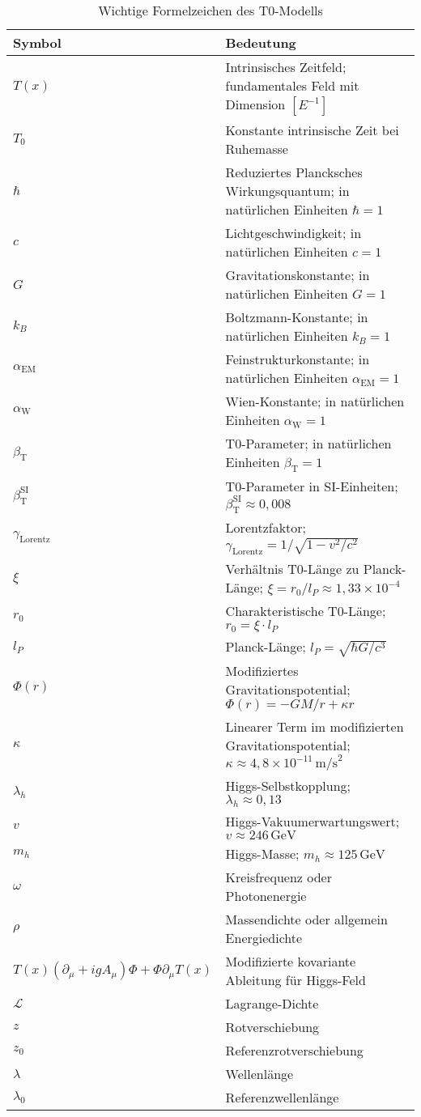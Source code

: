 \documentclass[12pt,a4paper]{article}
\newcommand{\Tfield}{T(x)}
\newcommand{\alphaEM}{\alpha_{\text{EM}}}
\newcommand{\alphaW}{\alpha_{\text{W}}}
\newcommand{\betaT}{\beta_{\text{T}}}
\newcommand{\Tzero}{T_0}
\newcommand{\gammaf}{\gamma_{\text{Lorentz}}}
\newcommand{\DhiggsT}{\Tfield (\partial_\mu + ig A_\mu) \Phi + \Phi \partial_\mu \Tfield}
\begin{document}
	\begin{table}[h]
		\centering
		\begin{tabular}{lp{12cm}}
			\toprule
			\textbf{Symbol} & \textbf{Bedeutung} \\
			\midrule
			$\Tfield$ & Intrinsisches Zeitfeld; fundamentales Feld mit Dimension $[E^{-1}]$ \\
			$\Tzero$ & Konstante intrinsische Zeit bei Ruhemasse \\
			$\hbar$ & Reduziertes Plancksches Wirkungsquantum; in natürlichen Einheiten $\hbar = 1$ \\
			$c$ & Lichtgeschwindigkeit; in natürlichen Einheiten $c = 1$ \\
			$G$ & Gravitationskonstante; in natürlichen Einheiten $G = 1$ \\
			$k_B$ & Boltzmann-Konstante; in natürlichen Einheiten $k_B = 1$ \\
			$\alphaEM$ & Feinstrukturkonstante; in natürlichen Einheiten $\alphaEM = 1$ \\
			$\alphaW$ & Wien-Konstante; in natürlichen Einheiten $\alphaW = 1$ \\
			$\betaT$ & T0-Parameter; in natürlichen Einheiten $\betaT = 1$ \\
			$\betaT^{\text{SI}}$ & T0-Parameter in SI-Einheiten; $\betaT^{\text{SI}} \approx 0,008$ \\
			$\gammaf$ & Lorentzfaktor; $\gammaf = 1/\sqrt{1-v^2/c^2}$ \\
			$\xi$ & Verhältnis T0-Länge zu Planck-Länge; $\xi = r_0/l_P \approx 1,33 \times 10^{-4}$ \\
			$r_0$ & Charakteristische T0-Länge; $r_0 = \xi \cdot l_P$ \\
			$l_P$ & Planck-Länge; $l_P = \sqrt{\hbar G/c^3}$ \\
			$\Phi(r)$ & Modifiziertes Gravitationspotential; $\Phi(r) = -GM/r + \kappa r$ \\
			$\kappa$ & Linearer Term im modifizierten Gravitationspotential; $\kappa \approx 4,8 \times 10^{-11} \, \text{m/s}^2$ \\
			$\lambda_h$ & Higgs-Selbstkopplung; $\lambda_h \approx 0,13$ \\
			$v$ & Higgs-Vakuumerwartungswert; $v \approx 246 \, \text{GeV}$ \\
			$m_h$ & Higgs-Masse; $m_h \approx 125 \, \text{GeV}$ \\
			$\omega$ & Kreisfrequenz oder Photonenergie \\
			$\rho$ & Massendichte oder allgemein Energiedichte \\
			$\DhiggsT$ & Modifizierte kovariante Ableitung für Higgs-Feld \\
			$\mathcal{L}$ & Lagrange-Dichte \\
			$z$ & Rotverschiebung \\
			$z_0$ & Referenzrotverschiebung \\
			$\lambda$ & Wellenlänge \\
			$\lambda_0$ & Referenzwellenlänge \\
			\bottomrule
		\end{tabular}
		\caption{Wichtige Formelzeichen des T0-Modells}
	\end{table}
	
\end{document}
